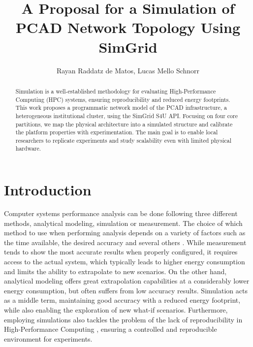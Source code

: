 \documentclass[12pt]{article}
\date{}
\title{A Proposal for a Simulation of PCAD Network Topology Using SimGrid}
\begin{document}
\makeatletter
\let\orgtitle\@title
\makeatother

\title{\orgtitle}

\author{
   Rayan Raddatz de Matos,
   Lucas Mello Schnorr
   }

\address{
   Institute of Informatics, Federal University of Rio Grande do Sul (UFRGS)\\
   Caixa Postal 15.064 -- 91.501-970 -- Porto Alegre -- RS -- Brazil
   }

\maketitle

\begin{abstract}
Simulation is a well-established methodology for evaluating
High-Performance Computing (HPC) systems, ensuring reproducibility and
reduced energy footprints. This work proposes a programmatic network
model of the PCAD infrastructure, a heterogeneous institutional
cluster, using the SimGrid S4U API. Focusing on four core partitions,
we map the physical architecture into a simulated structure and
calibrate the platform properties with experimentation. The main goal
is to enable local researchers to replicate experiments and study
scalability even with limited physical hardware.
\end{abstract}

\section{Introduction}
\label{sec:orga74e203}

Computer systems performance analysis can be done following three
different methods, analytical modeling, simulation or measurement. The
choice of which method to use when performing analysis depends on a
variety of factors such as the time available, the desired accuracy
and several others \cite{jain}. While measurement tends to show the most
accurate results when properly configured, it requires access to the
actual system, which typically leads to higher energy consumption and
limits the ability to extrapolate to new scenarios. On the other hand,
analytical modeling offers great extrapolation capabilities at a
considerably lower energy consumption, but often suffers from low
accuracy results. Simulation acts as a middle term, maintaining good
accuracy with a reduced energy footprint, while also enabling the
exploration of new what-if scenarios. Furthermore, employing
simulations also tackles the problem of the lack of reproducibility in
High-Performance Computing \cite{repro2024}, ensuring a controlled and
reproducible environment for experiments.
\end{document}
